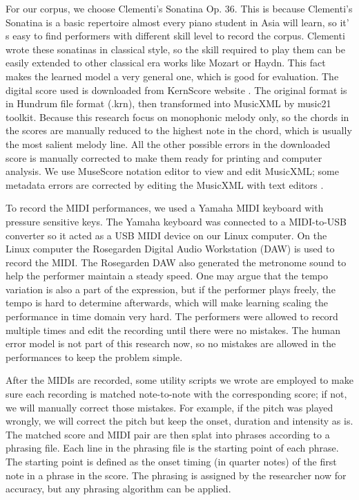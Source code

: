 For our corpus, we choose Clementi's Sonatina Op. 36.  This is because  Clementi's Sonatina is a basic repertoire almost every piano student in Asia will learn, so it' s easy to find performers with different skill level to record the corpus. Clementi wrote these sonatinas in classical style, so the skill required to play them can be easily extended to other classical era works like Mozart or Haydn. This fact makes the learned model a very general one, which is good for evaluation.
The digital score used is downloaded from KernScore website \cite{TODO:kernscore}. The original format is in Hundrum file format (.krn), then transformed into MusicXML by music21 toolkit. Because this research focus on monophonic melody only, so the chords in the scores are manually reduced to the highest note in the chord, which is usually the most salient melody line. All the other possible errors in the downloaded score is manually corrected to make them ready for printing and computer analysis. We use MuseScore notation editor to view and edit MusicXML; some metadata errors are corrected by editing the MusicXML with text editors .

To record the MIDI performances, we used a Yamaha MIDI keyboard with pressure sensitive keys. The Yamaha keyboard was connected to a MIDI-to-USB  converter so it acted as a USB MIDI device on our Linux computer. On the Linux computer the Rosegarden Digital Audio Workstation (DAW) is used to record the MIDI. The Rosegarden DAW also generated the metronome sound to help the performer maintain a steady speed. One may argue that the tempo variation is also a part of the expression, but if the performer plays freely, the tempo is hard to determine afterwards, which will make learning scaling the performance in time domain very hard.  The performers were allowed to record multiple times and edit the recording until there were no mistakes. The human error model is not part of this research now, so no mistakes are allowed in the performances to keep the problem simple.

  After the MIDIs are recorded, some utility scripts we wrote are employed to  make sure each recording is matched note-to-note with the corresponding score; if not, we will manually correct those mistakes. For example, if the pitch was played wrongly, we will correct the pitch but keep the onset, duration  and intensity as is. The matched score and MIDI pair are then splat into phrases according to a phrasing file.  Each line in the phrasing file is the starting point of each phrase. The starting point is defined as the onset timing (in quarter notes) of the first note in a phrase in the score.  The phrasing is assigned by the researcher now for accuracy, but any phrasing algorithm can be applied.


